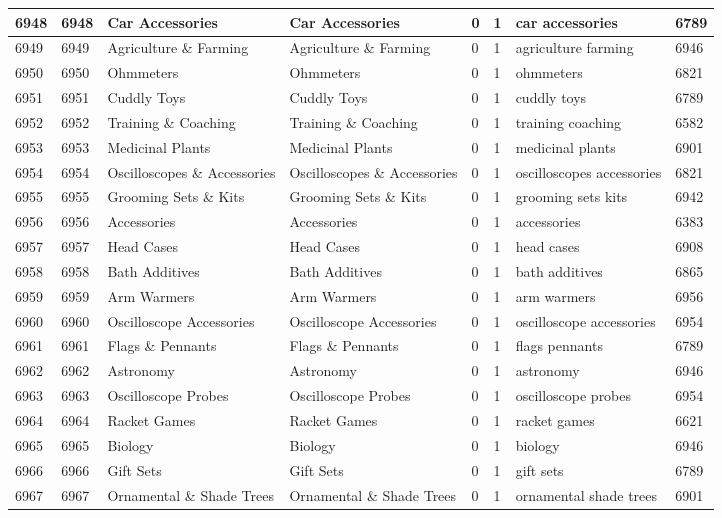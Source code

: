 \begin{longtable}{|l|l|l|l|l|l|l|l|}
6948 & 6948 & Car Accessories & Car Accessories & 0 & 1 & car accessories & 6789 \\ \hline 
6949 & 6949 & Agriculture \& Farming & Agriculture \& Farming & 0 & 1 & agriculture farming & 6946 \\ \hline 
6950 & 6950 & Ohmmeters & Ohmmeters & 0 & 1 & ohmmeters & 6821 \\ \hline 
6951 & 6951 & Cuddly Toys & Cuddly Toys & 0 & 1 & cuddly toys & 6789 \\ \hline 
6952 & 6952 & Training \& Coaching & Training \& Coaching & 0 & 1 & training coaching & 6582 \\ \hline 
6953 & 6953 & Medicinal Plants & Medicinal Plants & 0 & 1 & medicinal plants & 6901 \\ \hline 
6954 & 6954 & Oscilloscopes \& Accessories & Oscilloscopes \& Accessories & 0 & 1 & oscilloscopes accessories & 6821 \\ \hline 
6955 & 6955 & Grooming Sets \& Kits & Grooming Sets \& Kits & 0 & 1 & grooming sets kits & 6942 \\ \hline 
6956 & 6956 & Accessories & Accessories & 0 & 1 & accessories & 6383 \\ \hline 
6957 & 6957 & Head Cases & Head Cases & 0 & 1 & head cases & 6908 \\ \hline 
6958 & 6958 & Bath Additives & Bath Additives & 0 & 1 & bath additives & 6865 \\ \hline 
6959 & 6959 & Arm Warmers & Arm Warmers & 0 & 1 & arm warmers & 6956 \\ \hline 
6960 & 6960 & Oscilloscope Accessories & Oscilloscope Accessories & 0 & 1 & oscilloscope accessories & 6954 \\ \hline 
6961 & 6961 & Flags \& Pennants & Flags \& Pennants & 0 & 1 & flags pennants & 6789 \\ \hline 
6962 & 6962 & Astronomy & Astronomy & 0 & 1 & astronomy & 6946 \\ \hline 
6963 & 6963 & Oscilloscope Probes & Oscilloscope Probes & 0 & 1 & oscilloscope probes & 6954 \\ \hline 
6964 & 6964 & Racket Games & Racket Games & 0 & 1 & racket games & 6621 \\ \hline 
6965 & 6965 & Biology & Biology & 0 & 1 & biology & 6946 \\ \hline 
6966 & 6966 & Gift Sets & Gift Sets & 0 & 1 & gift sets & 6789 \\ \hline 
6967 & 6967 & Ornamental \& Shade Trees & Ornamental \& Shade Trees & 0 & 1 & ornamental shade trees & 6901 \\ \hline 

\end{longtable}
